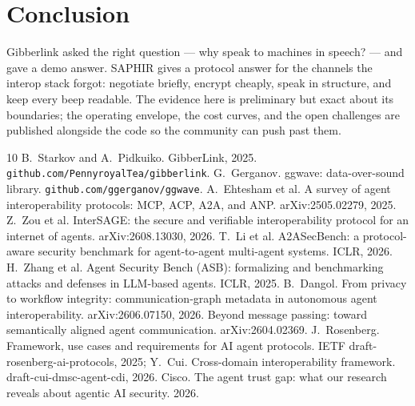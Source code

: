\documentclass[11pt]{article}
\begin{document}
\section{Conclusion}
Gibberlink asked the right question --- why speak to machines in speech? ---
and gave a demo answer. SAPHIR gives a protocol answer for the channels the
interop stack forgot: negotiate briefly, encrypt cheaply, speak in structure,
and keep every beep readable. The evidence here is preliminary but exact about
its boundaries; the operating envelope, the cost curves, and the open
challenges are published alongside the code so the community can push past
them.

\begin{thebibliography}{10}
 B.~Starkov and A.~Pidkuiko. GibberLink, 2025. \texttt{github.com/PennyroyalTea/gibberlink}.
 G.~Gerganov. ggwave: data-over-sound library. \texttt{github.com/ggerganov/ggwave}.
 A.~Ehtesham et al. A survey of agent interoperability protocols: MCP, ACP, A2A, and ANP. arXiv:2505.02279, 2025.
 Z.~Zou et al. InterSAGE: the secure and verifiable interoperability protocol for an internet of agents. arXiv:2608.13030, 2026.
 T.~Li et al. A2ASecBench: a protocol-aware security benchmark for agent-to-agent multi-agent systems. ICLR, 2026.
 H.~Zhang et al. Agent Security Bench (ASB): formalizing and benchmarking attacks and defenses in LLM-based agents. ICLR, 2025.
 B.~Dangol. From privacy to workflow integrity: communication-graph metadata in autonomous agent interoperability. arXiv:2606.07150, 2026.
 Beyond message passing: toward semantically aligned agent communication. arXiv:2604.02369.
 J.~Rosenberg. Framework, use cases and requirements for AI agent protocols. IETF draft-rosenberg-ai-protocols, 2025; Y.~Cui. Cross-domain interoperability framework. draft-cui-dmsc-agent-cdi, 2026.
 Cisco. The agent trust gap: what our research reveals about agentic AI security. 2026.
\end{thebibliography}
\end{document}
